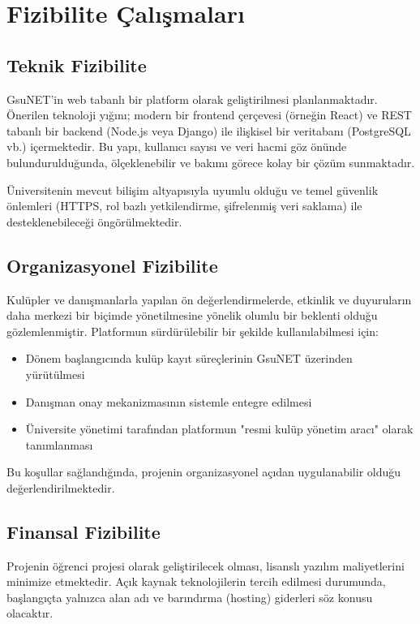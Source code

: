 \documentclass[a4paper,12pt]{report}
\begin{document}
\section{Fizibilite Çalışmaları}

\subsection{Teknik Fizibilite}

GsuNET'in web tabanlı bir platform olarak geliştirilmesi planlanmaktadır. Önerilen teknoloji yığını; modern bir frontend çerçevesi (örneğin React) ve REST tabanlı bir backend (Node.js veya Django) ile ilişkisel bir veritabanı (PostgreSQL vb.) içermektedir. Bu yapı, kullanıcı sayısı ve veri hacmi göz önünde bulundurulduğunda, ölçeklenebilir ve bakımı görece kolay bir çözüm sunmaktadır.

Üniversitenin mevcut bilişim altyapısıyla uyumlu olduğu ve temel güvenlik önlemleri (HTTPS, rol bazlı yetkilendirme, şifrelenmiş veri saklama) ile desteklenebileceği öngörülmektedir.

\subsection{Organizasyonel Fizibilite}

Kulüpler ve danışmanlarla yapılan ön değerlendirmelerde, etkinlik ve duyuruların daha merkezi bir biçimde yönetilmesine yönelik olumlu bir beklenti olduğu gözlemlenmiştir. Platformun sürdürülebilir bir şekilde kullanılabilmesi için:

\begin{itemize}
    \item Dönem başlangıcında kulüp kayıt süreçlerinin GsuNET üzerinden yürütülmesi
    \item Danışman onay mekanizmasının sistemle entegre edilmesi
    \item Üniversite yönetimi tarafından platformun "resmi kulüp yönetim aracı" olarak tanımlanması
\end{itemize}

Bu koşullar sağlandığında, projenin organizasyonel açıdan uygulanabilir olduğu değerlendirilmektedir.

\subsection{Finansal Fizibilite}

Projenin öğrenci projesi olarak geliştirilecek olması, lisanslı yazılım maliyetlerini minimize etmektedir. Açık kaynak teknolojilerin tercih edilmesi durumunda, başlangıçta yalnızca alan adı ve barındırma (hosting) giderleri söz konusu olacaktır.
\end{document}
